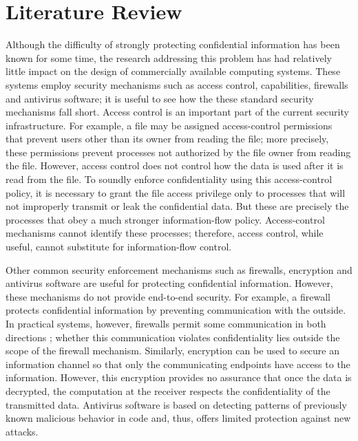 \chapter{Literature Review}

Although the difficulty of strongly protecting confidential
information has been known for some time, the research
addressing this problem has had relatively little impact on the
design of commercially available computing systems. These
systems employ security mechanisms such as access control,
capabilities, firewalls and antivirus software; it is useful to see
how the these standard security mechanisms fall short. Access control is an important part of the current
security infrastructure. For example, a file may be assigned
access-control permissions that prevent users other than its
owner from reading the file; more precisely, these permissions
prevent processes not authorized by the file owner from
reading the file. However, access control does not control how
the data is used after it is read from the file. To soundly enforce
confidentiality using this access-control policy, it is necessary
to grant the file access privilege only to processes that will
not improperly transmit or leak the confidential data. But
these are precisely the processes that obey a much stronger
information-flow policy. Access-control mechanisms cannot
identify these processes; therefore, access control, while useful,
cannot substitute for information-flow control. 

Other common security enforcement mechanisms such as
firewalls, encryption and antivirus software are useful for protecting
confidential information. However, these mechanisms
do not provide end-to-end security. For example, a firewall
protects confidential information by preventing communication
with the outside. In practical systems, however, firewalls
permit some communication in both directions \cite{ref_64_box2000simple};
whether this communication violates confidentiality lies outside
the scope of the firewall mechanism. Similarly, encryption
can be used to secure an information channel so that only
the communicating endpoints have access to the information.
However, this encryption provides no assurance that once the
data is decrypted, the computation at the receiver respects the
confidentiality of the transmitted data. Antivirus software is
based on detecting patterns of previously known malicious
behavior in code and, thus, offers limited protection against
new attacks.

